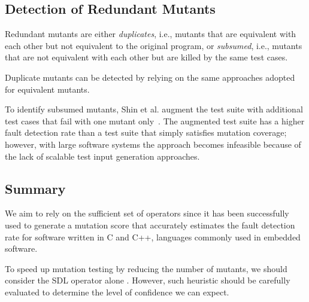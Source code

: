 
\subsection{Detection of Redundant Mutants}

Redundant mutants are either \emph{duplicates}, i.e., mutants that are equivalent with each other but not equivalent to the original program, or \emph{subsumed}, i.e., mutants that are not equivalent with each other but are killed by the same test cases. 

Duplicate mutants can be detected by relying on the same approaches adopted for equivalent mutants. 

To identify subsumed mutants, Shin et al. augment the test suite with additional test cases that fail with one mutant only~\cite{Shin:TSE:DCriterion:2018}. 
The augmented test suite has a higher
 fault detection rate than a test suite that simply satisfies mutation coverage; however, with large software systems the approach becomes infeasible because of the lack of scalable test input generation approaches.


\subsection{Summary}

We aim to rely on the sufficient set of operators since it has been successfully used to generate a mutation score that accurately estimates the fault detection rate for software written in C and C++, languages commonly used in embedded software.

To speed up mutation testing by reducing the number of mutants, we should consider the SDL operator alone . However, such heuristic should be carefully evaluated to determine the level of confidence we can expect.

